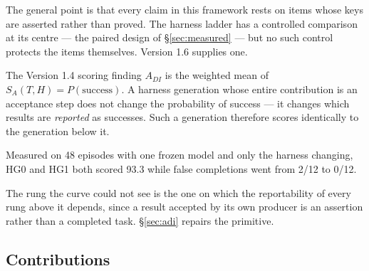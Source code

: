 \documentclass[11pt]{article}
\theoremstyle{definition}
\newcommand{\SA}{\ensuremath{S_A(T,H)}}
\begin{document}
The general point is that every claim in this framework rests on items whose keys are asserted rather than proved. The harness ladder has a controlled comparison at its centre --- the paired design of \S\ref{sec:measured} --- but no such control protects the items themselves. Version 1.6 supplies one.

\begin{cautionbox}{The Version 1.4 scoring finding}
$A_{DI}$ is the weighted mean of $\SA{} = P(\text{success})$. A harness generation whose entire contribution is an acceptance step does not change the probability of success --- it changes which results are \emph{reported} as successes. Such a generation therefore scores identically to the generation below it.

Measured on 48 episodes with one frozen model and only the harness changing, HG0 and HG1 both scored 93.3 while false completions went from 2/12 to 0/12.

The rung the curve could not see is the one on which the reportability of every rung above it depends, since a result accepted by its own producer is an assertion rather than a completed task. \S\ref{sec:adi} repairs the primitive.
\end{cautionbox}

\subsection{Contributions}
\end{document}
